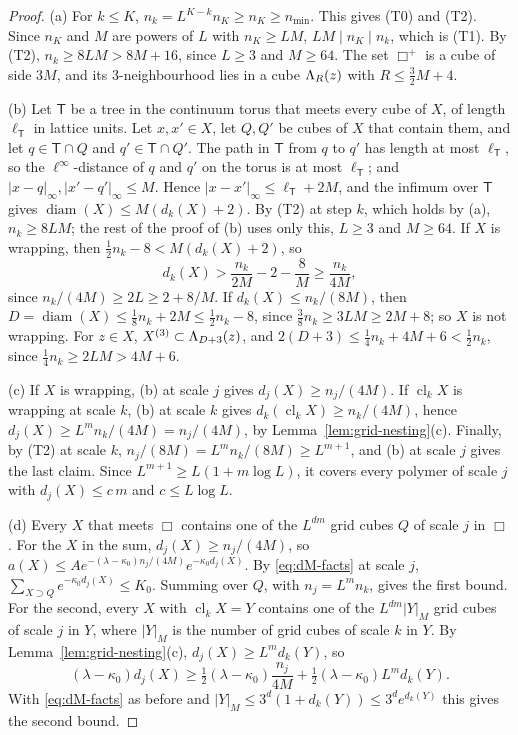 \begin{proof}
(a) For $k\le K$, $n_k=L^{K-k}n_K\ge n_K\ge n_{\min}$. This gives (T0) and (T2). Since $n_K$ and $M$ are powers of $L$ with $n_K\ge LM$, $LM\mid n_K\mid n_k$, which is (T1). By (T2), $n_k\ge8LM>8M+16$, since $L\ge3$ and $M\ge64$. The set $\Box^+$ is a cube of side $3M$, and its $3$-neighbourhood lies in a cube $\Lambda_R(z)$ with $R\le\frac32M+4$.

(b) Let $\mathsf T$ be a tree in the continuum torus that meets every cube of $X$, of length $\ell_{\mathsf T}$ in lattice units. Let $x,x'\in X$, let $Q,Q'$ be cubes of $X$ that contain them, and let $q\in\mathsf T\cap Q$ and $q'\in\mathsf T\cap Q'$. The path in $\mathsf T$ from $q$ to $q'$ has length at most $\ell_{\mathsf T}$, so the $\ell^\infty$-distance of $q$ and $q'$ on the torus is at most $\ell_{\mathsf T}$; and $|x-q|_\infty,|x'-q'|_\infty\le M$. Hence $|x-x'|_\infty\le\ell_{\mathsf T}+2M$, and the infimum over $\mathsf T$ gives $\operatorname{diam}(X)\le M(d_k(X)+2)$. By (T2) at step $k$, which holds by (a), $n_k\ge8LM$; the rest of the proof of (b) uses only this, $L\ge3$ and $M\ge64$. If $X$ is wrapping, then $\frac12n_k-8<M(d_k(X)+2)$, so
\[
d_k(X)>\frac{n_k}{2M}-2-\frac8M\ge\frac{n_k}{4M},
\]
since $n_k/(4M)\ge2L\ge2+8/M$. If $d_k(X)\le n_k/(8M)$, then $D=\operatorname{diam}(X)\le\frac18n_k+2M\le\frac12n_k-8$, since $\frac38n_k\ge3LM\ge2M+8$; so $X$ is not wrapping. For $z\in X$, $X^{(3)}\subset\Lambda_{D+3}(z)$, and $2(D+3)\le\frac14n_k+4M+6<\frac12n_k$, since $\frac14n_k\ge2LM>4M+6$.

(c) If $X$ is wrapping, (b) at scale $j$ gives $d_j(X)\ge n_j/(4M)$. If $\operatorname{cl}_kX$ is wrapping at scale $k$, (b) at scale $k$ gives $d_k(\operatorname{cl}_kX)\ge n_k/(4M)$, hence $d_j(X)\ge L^mn_k/(4M)=n_j/(4M)$, by Lemma~\ref{lem:grid-nesting}(c). Finally, by (T2) at scale $k$, $n_j/(8M)=L^mn_k/(8M)\ge L^{m+1}$, and (b) at scale $j$ gives the last claim. Since $L^{m+1}\ge L(1+m\log L)$, it covers every polymer of scale $j$ with $d_j(X)\le c\,m$ and $c\le L\log L$.

(d) Every $X$ that meets $\Box$ contains one of the $L^{dm}$ grid cubes $Q$ of scale $j$ in $\Box$. For the $X$ in the sum, $d_j(X)\ge n_j/(4M)$, so $a(X)\le Ae^{-(\lambda-\kappa_0)n_j/(4M)}e^{-\kappa_0d_j(X)}$. By \eqref{eq:dM-facts} at scale $j$, $\sum_{X\supset Q}e^{-\kappa_0d_j(X)}\le K_0$. Summing over $Q$, with $n_j=L^mn_k$, gives the first bound. For the second, every $X$ with $\operatorname{cl}_kX=Y$ contains one of the $L^{dm}|Y|_M$ grid cubes of scale $j$ in $Y$, where $|Y|_M$ is the number of grid cubes of scale $k$ in $Y$. By Lemma~\ref{lem:grid-nesting}(c), $d_j(X)\ge L^md_k(Y)$, so
\[
(\lambda-\kappa_0)d_j(X)\ge\tfrac12(\lambda-\kappa_0)\frac{n_j}{4M}+\tfrac12(\lambda-\kappa_0)L^md_k(Y).
\]
With \eqref{eq:dM-facts} as before and $|Y|_M\le3^d(1+d_k(Y))\le3^de^{d_k(Y)}$ this gives the second bound.


\end{proof}
